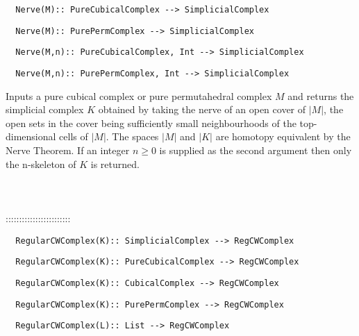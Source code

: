 \documentclass[a4paper,11pt]{report}
\begin{document}
{\begin{verbatim}  Nerve(M):: PureCubicalComplex --> SimplicialComplex
\end{verbatim}
 
\begin{verbatim}  Nerve(M):: PurePermComplex --> SimplicialComplex
\end{verbatim}
 
\begin{verbatim}  Nerve(M,n):: PureCubicalComplex, Int --> SimplicialComplex
\end{verbatim}
 
\begin{verbatim}  Nerve(M,n):: PurePermComplex, Int --> SimplicialComplex
\end{verbatim}


 

Inputs a pure cubical complex or pure permutahedral complex $M$ and returns the simplicial complex $K$ obtained by taking the nerve of an open cover of $|M|$, the open sets in the cover being sufficiently small neighbourhoods of the
top-dimensional cells of $|M|$. The spaces $|M|$ and $|K|$ are homotopy equivalent by the Nerve Theorem. If an integer $n \ge 0$ is supplied as the second argument then only the n-skeleton of $K$ is returned. \\
 \\
 \\
 \\
 ::::::::::::::::::::::::\\
 
\begin{verbatim}  RegularCWComplex(K):: SimplicialComplex --> RegCWComplex
\end{verbatim}
 
\begin{verbatim}  RegularCWComplex(K):: PureCubicalComplex --> RegCWComplex
\end{verbatim}
 
\begin{verbatim}  RegularCWComplex(K):: CubicalComplex --> RegCWComplex
\end{verbatim}
 
\begin{verbatim}  RegularCWComplex(K):: PurePermComplex --> RegCWComplex
\end{verbatim}
 
\begin{verbatim}  RegularCWComplex(L):: List --> RegCWComplex
\end{verbatim}
 
}
\end{document}
